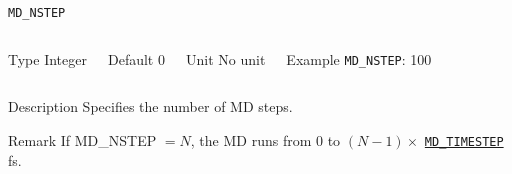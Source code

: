 \documentclass[xcolor=dvipsnames,t]{beamer}
\begin{document}
\begin{frame}[allowframebreaks]{\texttt{MD\_NSTEP}} \label{MD_NSTEP}
\vspace*{-12pt}
\begin{columns}
\begin{block}{Type}
Integer
\end{block}

\begin{block}{Default}
0
\end{block}

\begin{block}{Unit}
No unit
\end{block}

\begin{block}{Example}
\texttt{MD\_NSTEP}: 100
\end{block}
\end{columns}

\begin{block}{Description}
Specifies the number of MD steps.
\end{block}

\begin{block}{Remark}
If MD\_NSTEP $= N$, the MD runs from $0$ to $(N-1) \times$ \hyperlink{MD_TIMESTEP}{\texttt{MD\_TIMESTEP}} fs.  
\end{block}

\end{frame}
\end{document}
